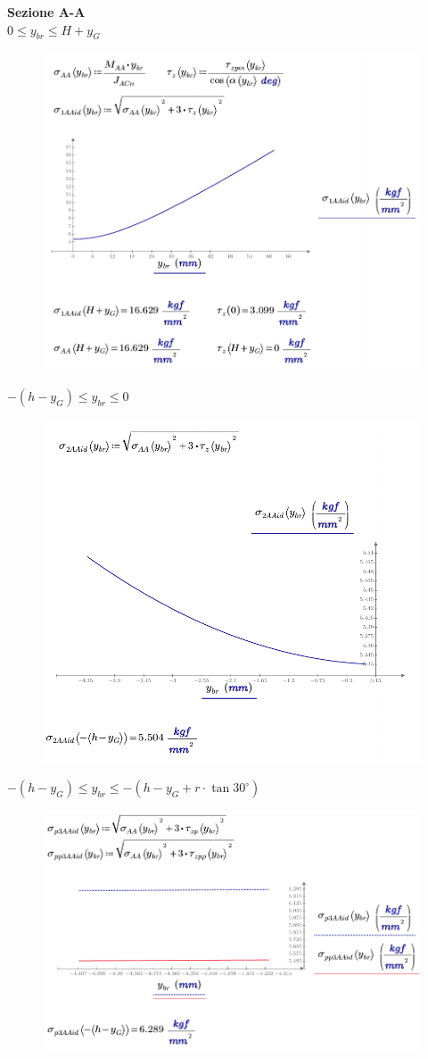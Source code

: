 \textbf{Sezione A-A}\\[1mm]
$0 \leq y_{br} \leq H+y_G$
\begin{figure}[H]
\centering
  \includegraphics[width=.68\textwidth]{imgs/MathAsse9_2}
\caption{}
\label{fig:MathAsse9_2}
\end{figure}
$- \left(h-y_G \right) \leq y_{br} \leq 0$
\begin{figure}[H]
\centering
  \includegraphics[width=.68\textwidth]{imgs/MathAsse9_3}
\caption{}
\label{fig:MathAsse9_3}
\end{figure}
$- \left(h-y_G \right) \leq y_{br} \leq - \left( h - y_G + r \cdot \tan 30^{\circ} \right)$
\begin{figure}[H]
\centering
  \includegraphics[width=.7\textwidth]{imgs/MathAsse9_4}
\caption{}
\label{fig:MathAsse9_4}
\end{figure}
